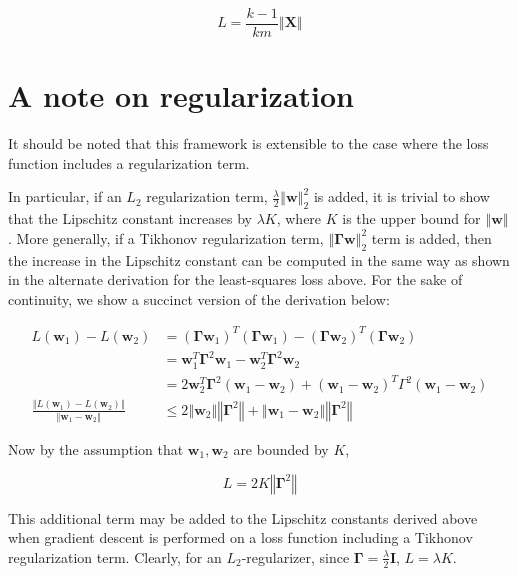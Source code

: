\documentclass{article}
\begin{document}
\[
    \boxed{
        L = \frac{k-1}{km}\left\Vert \textbf{X} \right\Vert
    }
\]

\section{A note on regularization} \label{regularization}
It should be noted that this framework is extensible to the case where the loss function includes a regularization term. 

In particular, if an $L_2$ regularization term, $\frac{\lambda}{2}\left\Vert \textbf{w} \right\Vert_2^2$ is added, it is trivial to show that the Lipschitz constant increases by $\lambda K$, where $K$ is the upper bound for $\left\Vert \textbf{w} \right\Vert$. More generally, if a Tikhonov regularization term, $\left\Vert \boldsymbol\Gamma \textbf{w} \right\Vert_2^2$ term is added, then the increase in the Lipschitz constant can be computed in the same way as shown in the alternate derivation for the least-squares loss above. For the sake of continuity, we show a succinct version of the derivation below:

\[
    \begin{aligned}
        L(\textbf{w}_1) - L(\textbf{w}_2) &= (\boldsymbol\Gamma \textbf{w}_1)^T (\boldsymbol\Gamma \textbf{w}_1) - (\boldsymbol\Gamma \textbf{w}_2)^T (\boldsymbol\Gamma \textbf{w}_2) \\
        &= \textbf{w}_1^T \boldsymbol\Gamma^2 \textbf{w}_1 - \textbf{w}_2^T \boldsymbol\Gamma^2 \textbf{w}_2 \\
        &= 2\textbf{w}_2^T \boldsymbol\Gamma^2 (\textbf{w}_1 - \textbf{w}_2) + (\textbf{w}_1-\textbf{w}_2)^T \Gamma^2 (\textbf{w}_1-\textbf{w}_2) \\
        \frac{\left\Vert L(\textbf{w}_1) - L(\textbf{w}_2) \right\Vert}{\left\Vert \textbf{w}_1-\textbf{w}_2 \right\Vert} & \leq 2 \left\Vert \textbf{w}_2 \right\Vert \left\Vert \boldsymbol\Gamma^2 \right\Vert + \left\Vert \textbf{w}_1-\textbf{w}_2 \right\Vert \left\Vert \boldsymbol\Gamma^2 \right\Vert 
    \end{aligned}
\]

Now by the assumption that $\textbf{w}_1, \textbf{w}_2$ are bounded by $K$, 

\[
    \boxed{
        L = 2K \left\Vert \boldsymbol\Gamma^2 \right\Vert
    }
\]

This additional term may be added to the Lipschitz constants derived above when gradient descent is performed on a loss function including a Tikhonov regularization term. Clearly, for an $L_2$-regularizer, since $\boldsymbol\Gamma = \frac{\lambda}{2}\textbf{I}$, $L = \lambda K$.
\end{document}
